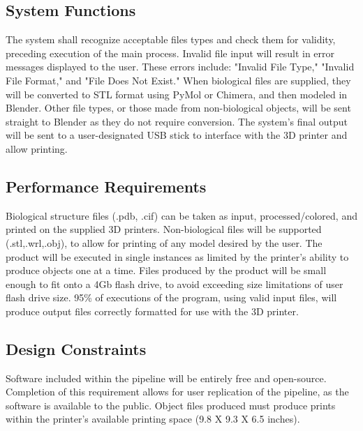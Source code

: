 \documentclass[letterpaper, onecolumn, draftclsnofoot, 10pt, compsoc]{IEEEtran}
\begin{document}
    \subsection{System Functions}
    The system shall recognize acceptable files types and check them for validity, preceding execution of the main process.
    Invalid file input will result in error messages displayed to the user.
    These errors include: "Invalid File Type," "Invalid File Format," and "File Does Not Exist."
    When biological files are supplied, they will be converted to STL format using PyMol or Chimera, and then modeled in Blender. 
    Other file types, or those made from non-biological objects, will be sent straight to Blender as they do not require conversion.
    The system's final output will be sent to a user-designated USB stick to interface with the 3D printer and allow printing.
    
    \subsection{Performance Requirements}
    Biological structure files (.pdb, .cif) can be taken as input, processed/colored, and printed on the supplied 3D printers.
	Non-biological files will be supported (.stl,.wrl,.obj), to allow for printing of any model desired by the user.
    The product will be executed in single instances as limited by the printer's ability to produce objects one at a time.
    Files produced by the product will be small enough to fit onto a 4Gb flash drive, to avoid exceeding size limitations of user flash drive size.
    95\% of executions of the program, using valid input files, will produce output files correctly formatted for use with the 3D printer.
    
    \subsection{Design Constraints}
    Software included within the pipeline will be entirely free and open-source. 
    Completion of this requirement allows for user replication of the pipeline, as the software is available to the public.
    Object files produced must produce prints within the printer's available printing space (9.8 X 9.3 X 6.5 inches).
    
\end{document}
